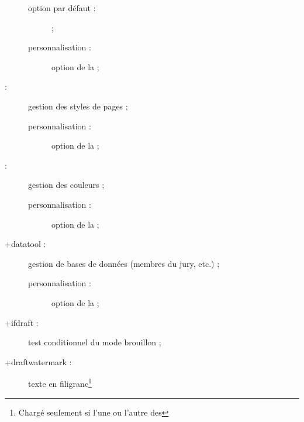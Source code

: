 \begin{description}
  \begin{description}
  \item[option par défaut :]  ;
  \item[personnalisation :] option  de la \yatCl ;
  \end{description}
\item[\package{titleps} :] %
  gestion des styles de pages ;
  \begin{description}
  \item[personnalisation :] option  de la \yatCl ;
  \end{description}
\item[\package{xcolor} :] %
  gestion des couleurs ;
  \begin{description}
  \item[personnalisation :] option  de la \yatCl ;
  \end{description}
\item[\package*+{datatool} :] gestion de bases de données (membres du jury,
  etc.) ;
  \begin{description}
  \item[personnalisation :] option  de la \yatCl ;
  \end{description}
\item[\package*+{ifdraft} :] test conditionnel du mode brouillon ;
\item[\package+{draftwatermark} :] texte en
  filigrane\footnote{Chargé seulement si l'une ou l'autre des
}
\end{description}

